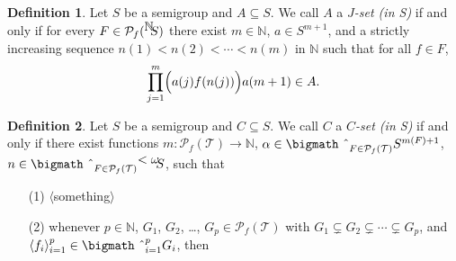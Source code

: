 \documentclass[12pt]{article}
\theoremstyle{plain}
\theoremstyle{definition}
\newtheorem*{defn}{Definition}
\newcommand{\la}{\langle}
\newcommand{\ra}{\rangle}
\newcommand{\bbN}{\mathbb{N}}
\newcommand{\calT}{\mathcal{T}}
\newcommand{\Pf}{\mathcal{P}_f}
\newcommand{\setfunc}[2]{\hbox{${}^{\hbox{$#1$}}\hskip -3 pt #2$}}
\newcommand{\bigtimes}{\hbox{\bigmath \char'2}}
\begin{document}
\begin{defn}
  Let $S$ be a semigroup and $A \subseteq S$.
  We call $A$ a \textsl{$J$-set (in S)} if and only if for every $F
  \in \Pf(\setfunc{\bbN}{S})$ there exist $m \in \bbN$, $a \in
  S^{m+1}$, and a strictly increasing sequence $n(1) < n(2) < \cdots <
  n(m)$ in $\bbN$ such that for all $f \in F$,
  \[
    \prod_{j=1}^m \Bigr( a(j) f(n(j)) \Bigl) a(m+1) \in A.
  \]
\end{defn}

\begin{defn}
  Let $S$ be a semigroup and $C \subseteq S$. 
  We call $C$ a \textsl{$C$-set (in S)} if and only if there exist
  functions $m \colon \Pf(\calT) \to \bbN$, $\alpha \in \bigtimes_{F
    \in \Pf(\calT)} S^{m(F) + 1}$, $n \in \bigtimes_{F \in \Pf(\calT)}
  \setfunc{<\omega}{S}$, such that
  \begin{itemize}
    \item[(1)] \mbox{$\la$something$\ra$}
    \item[(2)] whenever $p \in \bbN$, $G_1$, $G_2$, \ldots, $G_p \in
      \Pf(\calT)$ with $G_1 \subsetneq G_2 \subsetneq \cdots
      \subsetneq G_p$, and $\la f_i \ra_{i=1}^p \in \bigtimes_{i=1}^p
      G_i$, then 
  \end{itemize}
\end{defn}
\end{document}
